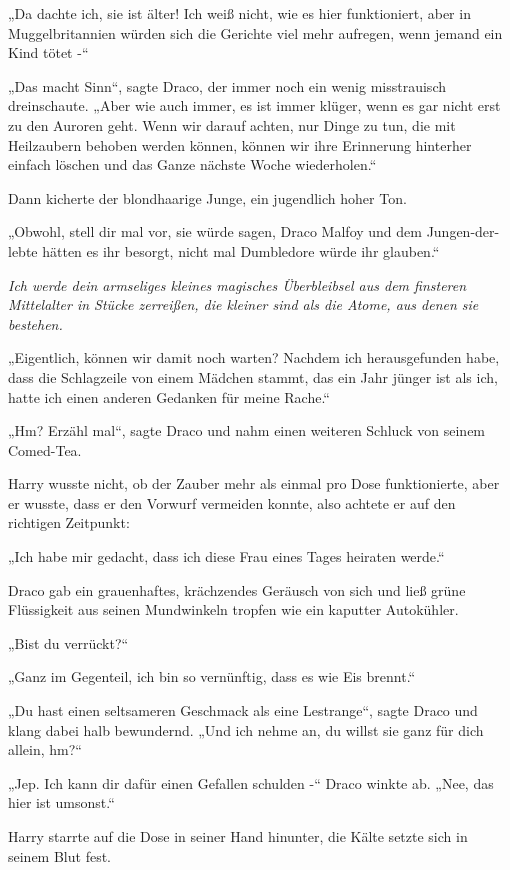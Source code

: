 {„Da dachte ich, sie ist älter! Ich weiß nicht, wie es hier funktioniert, aber in Muggelbritannien würden sich die Gerichte viel mehr aufregen, wenn jemand ein Kind tötet -“

„Das macht Sinn“, sagte Draco, der immer noch ein wenig misstrauisch dreinschaute. „Aber wie auch immer, es ist immer klüger, wenn es gar nicht erst zu den Auroren geht. Wenn wir darauf achten, nur Dinge zu tun, die mit Heilzaubern behoben werden können, können wir ihre Erinnerung hinterher einfach löschen und das Ganze nächste Woche wiederholen.“

Dann kicherte der blondhaarige Junge, ein jugendlich hoher Ton.

„Obwohl, stell dir mal vor, sie würde sagen, Draco Malfoy und dem Jungen-der-lebte hätten es ihr besorgt, nicht mal Dumbledore würde ihr glauben.“

\emph{Ich werde dein armseliges kleines magisches Überbleibsel aus dem finsteren Mittelalter in Stücke zerreißen, die kleiner sind als die Atome, aus denen sie bestehen.}

„Eigentlich, können wir damit noch warten? Nachdem ich herausgefunden habe, dass die Schlagzeile von einem Mädchen stammt, das ein Jahr jünger ist als ich, hatte ich einen anderen Gedanken für meine Rache.“

„Hm? Erzähl mal“, sagte Draco und nahm einen weiteren Schluck von seinem Comed-Tea.

Harry wusste nicht, ob der Zauber mehr als einmal pro Dose funktionierte, aber er wusste, dass er den Vorwurf vermeiden konnte, also achtete er auf den richtigen Zeitpunkt:

„Ich habe mir gedacht, dass ich diese Frau eines Tages heiraten werde.“

Draco gab ein grauenhaftes, krächzendes Geräusch von sich und ließ grüne Flüssigkeit aus seinen Mundwinkeln tropfen wie ein kaputter Autokühler.

„Bist du verrückt?“

„Ganz im Gegenteil, ich bin so vernünftig, dass es wie Eis brennt.“

„Du hast einen seltsameren Geschmack als eine Lestrange“, sagte Draco und klang dabei halb bewundernd. „Und ich nehme an, du willst sie ganz für dich allein, hm?“

„Jep. Ich kann dir dafür einen Gefallen schulden -“ Draco winkte ab. „Nee, das hier ist umsonst.“

Harry starrte auf die Dose in seiner Hand hinunter, die Kälte setzte sich in seinem Blut fest.

}
